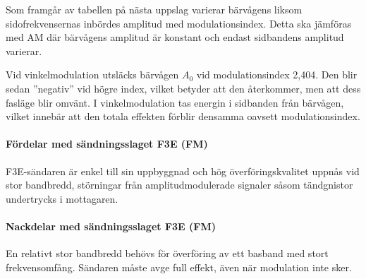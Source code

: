 Som framgår av tabellen på nästa uppslag varierar bärvågens liksom
sidofrekvensernas inbördes amplitud med modulationsindex.
Detta ska jämföras med AM där bärvågens amplitud är konstant och endast
sidbandens amplitud varierar.

Vid vinkelmodulation utsläcks bärvågen \(A_0\) vid modulationsindex 2,404.
Den blir sedan ''negativ'' vid högre index, vilket betyder att den återkommer,
men att dess fasläge blir omvänt.
I vinkelmodulation tas energin i sidbanden från bärvågen, vilket innebär att
den totala effekten förblir densamma oavsett modulationsindex.


\paragraph{Fördelar med sändningsslaget F3E (FM)}
F3E-sän\-daren är enkel till sin uppbyggnad och hög överföringskvalitet
uppnås vid stor bandbredd, störningar från amplitudmodulerade signaler såsom
tändgnistor undertrycks i mottagaren.

\paragraph{Nackdelar med sändningsslaget F3E (FM)}
En relativt stor bandbredd behövs för överföring av ett basband med stort
frekvensomfång.
Sändaren måste avge full effekt, även när modulation inte sker.


